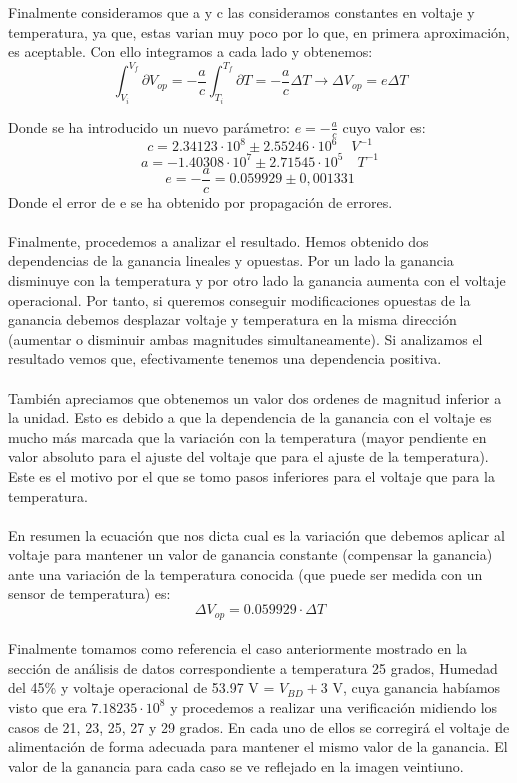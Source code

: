 \documentclass[11pt, a4paper]{article}
\begin{document}
Finalmente consideramos que a y c las consideramos constantes en voltaje y temperatura, ya que, estas varian muy poco por lo que, en primera aproximación, es aceptable. Con ello integramos a cada lado y obtenemos:
$$\int_{V_i}^{V_f} \partial V_{op}= - \frac{a}{c} \int_{T_i}^{T_f}\partial T = - \frac{a}{c} \Delta T \longrightarrow \Delta V_{op}= e \Delta T$$

Donde se ha introducido un nuevo parámetro: $e=-\frac{a}{c}$ cuyo valor es:
$$c=2.34123 \cdot 10^8 \pm 2.55246 \cdot 10^6 \quad V^{-1}$$
$$a=-1.40308 \cdot 10^7 \pm 2.71545 \cdot 10^5 \quad T^{-1}$$
$$e=-\frac{a}{c} = 0.059929 \pm 0,001331$$
Donde el error de e se ha obtenido por propagación de errores. 
\paragraph {}
Finalmente, procedemos a analizar el resultado. Hemos obtenido dos dependencias de la ganancia lineales y opuestas. Por un lado la ganancia disminuye con la temperatura y por otro lado la ganancia aumenta con el voltaje operacional. Por tanto, si queremos conseguir modificaciones opuestas de la ganancia debemos desplazar voltaje y temperatura en la misma dirección (aumentar o disminuir ambas magnitudes simultaneamente). Si analizamos el resultado vemos que, efectivamente tenemos una dependencia positiva.

\paragraph {}
También apreciamos que obtenemos un valor dos ordenes de magnitud inferior a la unidad. Esto es debido a que la dependencia de la ganancia con el voltaje es mucho más marcada que la variación con la temperatura (mayor pendiente en valor absoluto para el ajuste del voltaje que para el ajuste de la temperatura). Este es el motivo por el que se tomo pasos inferiores para el voltaje que para la temperatura. 

\paragraph {}
En resumen la ecuación que nos dicta cual es la variación que debemos aplicar al voltaje para mantener un valor de ganancia constante (compensar la ganancia) ante una variación de la temperatura conocida (que puede ser medida con un sensor de temperatura) es:
$$\Delta V_{op}=0.059929 \cdot \Delta T$$

\paragraph {}
Finalmente tomamos como referencia el caso anteriormente mostrado en la sección de análisis de datos correspondiente a temperatura 25 grados, Humedad del 45\% y voltaje operacional de 53.97 V = $V_{BD}+ 3$ V, cuya ganancia habíamos visto que era $7.18235 \cdot 10^8$ y procedemos a realizar una verificación midiendo los casos de 21, 23, 25, 27 y 29 grados. En cada uno de ellos se corregirá el voltaje de alimentación de forma adecuada para mantener el mismo valor de la ganancia. El valor de la ganancia para cada caso se ve reflejado en la imagen veintiuno. 
\end{document}

